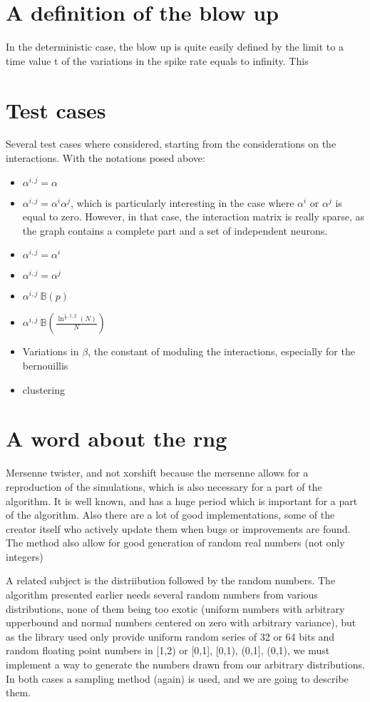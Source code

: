 \documentclass{report}
\begin{document}
\section{A definition of the blow up}
	In the deterministic case, the blow up is quite easily defined by the limit to a time value t of the variations in the spike rate equals to infinity. This 

\section{Test cases}
	Several test cases where considered, starting from the considerations on the interactions. With the notations posed above:\\
	\begin{itemize}
		\item $ \alpha^{i,j}=\alpha $
		\item $ \alpha^{i,j}=\alpha^i\alpha^j $, which is particularly interesting in the case where $ \alpha^i\text{ or }\alpha^j $ is equal to zero. However, in that case, the interaction matrix is really sparse, as the graph contains a complete part and a set of independent neurons.
		\item $ \alpha^{i,j}=\alpha^i $
		\item $ \alpha^{i,j}=\alpha^j $
		\item $ \alpha^{i,j}~\mathbb{B}(p) $
		\item $ \alpha^{i,j}~\mathbb{B}(\frac{\ln^{\frac{1}{2},1,2}(N)}{N}) $
		\item Variations in $ \beta $, the constant of moduling the interactions, especially for the bernouillis
		\item clustering
	\end{itemize}

\section{A word about the rng}
	Mersenne twister, and not xorshift because the mersenne allows for a reproduction of the simulations, which is also necessary for a part of the algorithm. It is well known, and has a huge period which is important for a part of the algorithm. Also there are a lot of good implementations, some of the creator itself who actively update them when bugs or improvements are found. The method also allow for good generation of random real numbers (not only integers)

	A related subject is the distriibution followed by the random numbers. The algorithm presented earlier needs several random numbers from various distributions, none of them being too exotic (uniform numbers with arbitrary upperbound and normal numbers centered on zero with arbitrary variance), but as the library used only provide uniform random series of 32 or 64 bits and random floating point numbers in [1,2) or {[0,1], [0,1), (0,1], (0,1)}, we must implement a way to generate the numbers drawn from our arbitrary distributions. In both cases a sampling method (again) is used, and we are going to describe them.
\end{document}
